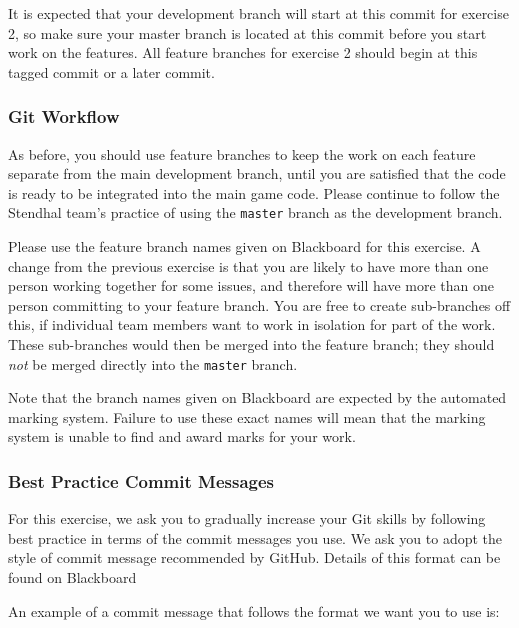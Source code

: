 \documentclass[
]{book}
\begin{document}
It is expected that your development branch will start at this commit for exercise 2, so make sure your master branch is located at this commit before you start work on the features. All feature branches for exercise 2 should begin at this tagged commit or a later commit.

\hypertarget{gitworkflow}{%
\subsubsection*{Git Workflow}\label{gitworkflow}}

As before, you should use feature branches to keep the work on each feature separate from the main development branch, until you are satisfied that the code is ready to be integrated into the main game code. Please continue to follow the Stendhal team's practice of using the \texttt{master} branch as the development branch.

Please use the feature branch names given on Blackboard for this exercise. A change from the previous exercise is that you are likely to have more than one person working together for some issues, and therefore will have more than one person committing to your feature branch. You are free to create sub-branches off this, if individual team members want to work in isolation for part of the work. These sub-branches would then be merged into the feature branch; they should \emph{not} be merged directly into the \texttt{master} branch.

Note that the branch names given on Blackboard are expected by the automated marking system. Failure to use these exact names will mean that the marking system is unable to find and award marks for your work.

\hypertarget{bpcm}{%
\subsubsection*{Best Practice Commit Messages}\label{bpcm}}

For this exercise, we ask you to gradually increase your Git skills by following best practice in terms of the commit messages you use. We ask you to adopt the style of commit message recommended by GitHub. Details of this format can be found on Blackboard

An example of a commit message that follows the format we want you to use is:
\end{document}
